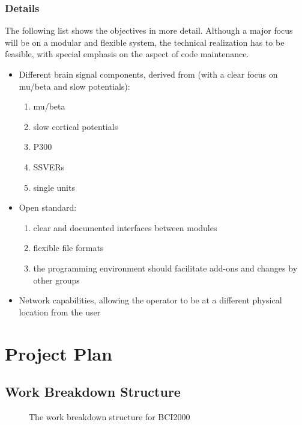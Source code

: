 \documentclass[letterpaper,oneside,12pt]{book}
\newcommand{\todo}[1]{}
\begin{document}
\subsection{Details}

The following list shows the objectives in more detail. Although a major focus 
will be on a modular and flexible system, the technical realization has to be 
feasible, with special emphasis on the aspect of code maintenance.

\begin{itemize}
 \item{Different brain signal components, derived from (with a clear focus on mu/beta and slow potentials):}
    \begin{enumerate}
      \item{mu/beta}
      \item{slow cortical potentials}
      \item{P300}
      \item{SSVERs}
      \item{single units}
    \end{enumerate}
 \item{Open standard:}
    \begin{enumerate}
      \item{clear and documented interfaces between modules}
      \item{flexible file formats}
      \item{the programming environment should facilitate add-ons and changes by other groups}
    \end{enumerate}
 \item{Network capabilities, allowing the operator to be at a different physical location from the user}
\end{itemize}


\chapter{Project Plan}
\todo{Should we drop this chapter, or update it?}

\section{Work Breakdown Structure}

\begin{figure}[ht]
 \centerline{}
 \caption{The work breakdown structure for BCI2000}
\end{figure}
\end{document}

